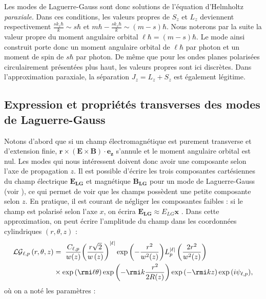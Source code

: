 Les modes de Laguerre-Gauss sont donc solutions de l'équation d'Helmholtz \textit{paraxiale}. Dans ces conditions, les valeurs propres de $S_z$ et $L_z$ deviennent respectivement $\frac{sk_z\hbar}{k}\sim s\hbar$ et $m\hbar-\frac{sk_z\hbar}{k}\sim (m-s)\hbar$. Nous noterons par la suite la valeur propre du moment angulaire orbital $\ell\hbar = (m-s)\hbar$. Le mode ainsi construit porte donc un moment angulaire orbital de $\ell\hbar$ par photon et un moment de spin de $s\hbar$ par photon.
De même que pour les ondes planes polarisées circulairement présentées plus haut, les valeurs propres sont ici discrètes. Dans l'approximation paraxiale, la séparation $J_z=L_z+S_z$ est également légitime.

\subsection{Expression et propriétés transverses des modes de Laguerre-Gauss}
Notons d'abord que si un champ électromagnétique est purement transverse et d'extension finie, $\bm{r}\times(\bm{E}\times\bm{B})\cdot\bm{e_z}$ s'annule et le moment angulaire orbital est nul. Les modes qui nous intéressent doivent donc avoir une composante selon l'axe de propagation $z$. Il est possible d'écrire les trois composantes cartésiennes du champ électrique $\bm{E_{LG}}$ et magnétique $\bm{B_{LG}}$ pour un mode de Laguerre-Gauss (voir ), ce qui permet de voir que les champs possèdent une petite composante selon $z$. En pratique, il est courant de négliger les composantes faibles : si le champ est polarisé selon l'axe $x$, on écrira $\bm{E_{LG}} \approx E_{LG} \bm{x}$ . Dans cette approximation, on peut écrire l'amplitude du champ dans les  coordonnées cylindriques $(r,\theta,z)$ :
\begin{align}
{\mathcal{LG}_{\ell,p} }\left( {r,\theta ,z} \right) &= {\;}\frac{C_{\ell,p}}{w(z)}
{\left( {\frac{r\sqrt{2}}{{w\left(z\right)}}} \right)^{\left| \ell  \right|}}
\exp{\left(- \frac{{{r^2}}}{{{{w^2(z)}}}}\right)}
L_p^{\left| \ell  \right|}\left(\frac{2r^2}{w^2(z)}\right)\nonumber\\
&\times
\exp{({\rmi}\ell \theta )}
\exp{\left(-{\rmi}k\frac{r^2}{2R(z)}\right)}
\exp{(-{\rmi}kz)}
\exp{(i\psi _{\ell ,p})},
\label{eq:lgmodes} 
\end{align}
où on a noté les paramètres :
